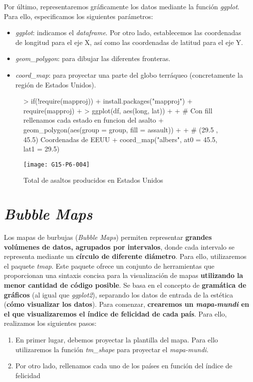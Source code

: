 \documentclass [a4paper] {article}
\begin{document}
Por último, representaremos gráficamente los datos mediante la función \textit{ggplot}. Para ello, especificamos los siguientes parámetros:
\begin{itemize}
  \item \textit{ggplot}: indicamos el \textit{dataframe}. Por otro lado, establecemos las coordenadas de longitud para el eje X, así como las coordenadas de latitud para el eje Y.
  \item \textit{geom\_polygon}: para dibujar las diferentes fronteras.
  \item \textit{coord\_map}: para proyectar una parte del globo terráqueo (concretamente la región de Estados Unidos).
\end{itemize}
\begin{figure}[hpbt!]
\centering
\begin{Schunk}
\begin{Sinput}
> if(!require(mapproj)){
+   install.packages("mapproj")
+   require(mapproj)
+ }
> ggplot(df, aes(long, lat)) +
+   # Con fill rellenamos cada estado en funcion del asalto
+   geom_polygon(aes(group = group, fill = assault)) +
+   # (29.5 , 45.5) Coordenadas de EEUU
+   coord_map("albers",  at0 = 45.5, lat1 = 29.5)
\end{Sinput}
\end{Schunk}
\texttt{[image: G15-P6-004]}
\caption{Total de asaltos producidos en Estados Unidos}
\end{figure}
\newpage

\section{\textit{Bubble Maps}}
Los mapas de burbujas (\textit{Bubble Maps}) permiten representar \textbf{grandes volúmenes de datos, agrupados por intervalos}, donde cada intervalo se representa mediante un \textbf{círculo de diferente diámetro}. Para ello, utilizaremos el paquete \textit{tmap}. Este paquete ofrece un conjunto de herramientas que proporcionan una sintaxis concisa para la visualización de mapas \textbf{utilizando la menor cantidad de código posible}. Se basa en el concepto de \textbf{gramática de gráficos} (al igual que \textit{ggplot2}), separando los datos de entrada de la estética (\textbf{cómo visualizar los datos}). Para comenzar, \textbf{crearemos un \textit{mapa-mundi} en el que visualizaremos el índice de felicidad de cada país}. Para ello, realizamos los siguientes pasos:
\begin{enumerate}
  \item En primer lugar, debemos proyectar la plantilla del mapa. Para ello utilizaremos la función \textit{tm\_shape} para proyectar el \textit{mapa-mundi}.
  \item Por otro lado, rellenamos cada uno de los países en función del índice de felicidad
\end{enumerate}
\end{document}
